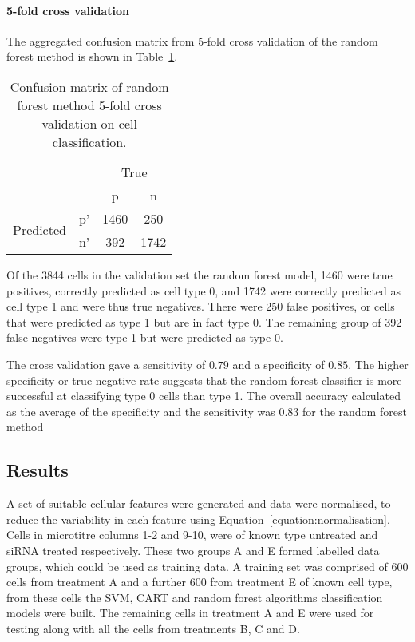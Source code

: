 \paragraph{5-fold cross validation}
The aggregated confusion matrix from 5-fold cross validation of the random forest method is shown in Table~\ref{table:endothelial_morphometry:random_forest_confusion_matrix}.
\begin{table}[htbp!]
\caption[Confusion matrix of random forest cross validation on cell classification]{Confusion matrix of random forest method 5-fold cross validation on cell classification.}
\label{table:endothelial_morphometry:random_forest_confusion_matrix}
\centering
\begin{tabular}{cc|cc}
	\multicolumn{2}{c}{}&\multicolumn{2}{c}{True}\\
	\multicolumn{2}{c|}{}& p & n\\
	\cline{2-4}
	\multirow{2}{*}{Predicted}& p' & 1460 & 250\\ & n' & 392 & 1742\\
\end{tabular}
\end{table}

Of the 3844 cells in the validation set the random forest model, 1460 were true positives, correctly predicted as cell type 0, and 1742 were correctly predicted as cell type 1 and were thus true negatives. There were 250 false positives, or cells that were predicted as type 1 but are in fact type 0. The remaining group of 392 false negatives were type 1 but were predicted as type 0.

The cross validation gave a sensitivity of $0.79$ and a specificity of $0.85$. The higher specificity or true negative rate suggests that the random forest classifier is more successful at classifying type 0 cells than type 1. The overall accuracy calculated as the average of the specificity and the sensitivity was $0.83$ for the random forest method

\subsection{Results}
A set of suitable cellular features were generated and data were normalised, to reduce the variability in each feature using Equation~\ref{equation:normalisation}. Cells in microtitre columns 1-2 and 9-10, were of known type untreated and siRNA treated respectively. These two groups A and E formed labelled data groups, which could be used as training data. A training set was comprised of 600 cells from treatment A and a further 600 from treatment E of known cell type, from these cells the SVM, CART and random forest algorithms classification models were built. The remaining cells in treatment A and E were used for testing along with all the cells from treatments B, C and D.

